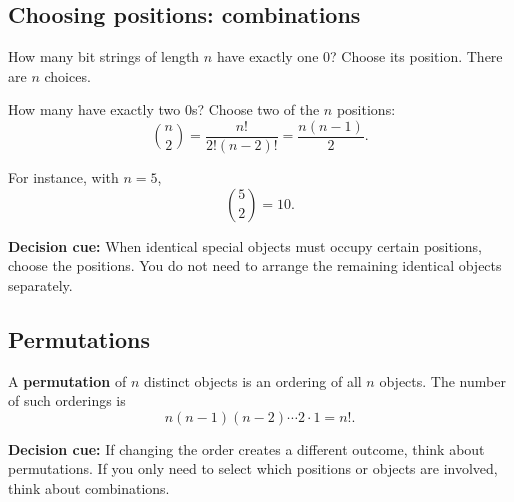 \documentclass[11pt]{article}
\begin{document}
\subsection{Choosing positions: combinations}

How many bit strings of length $n$ have exactly one $0$?
Choose its position. There are $n$ choices.

How many have exactly two $0$s? Choose two of the $n$ positions:
\[
\binom{n}{2}
=\frac{n!}{2!(n-2)!}
=\frac{n(n-1)}{2}.
\]

For instance, with $n=5$,
\[
\binom{5}{2}=10.
\]

\textbf{Decision cue:} When identical special objects must occupy
certain positions, choose the positions. You do not need to arrange
the remaining identical objects separately.

\subsection{Permutations}

A \textbf{permutation} of $n$ distinct objects is an ordering of
all $n$ objects. The number of such orderings is
\[
n(n-1)(n-2)\cdots2\cdot1=n!.
\]

\textbf{Decision cue:} If changing the order creates a different
outcome, think about permutations. If you only need to select which
positions or objects are involved, think about combinations.
\end{document}
